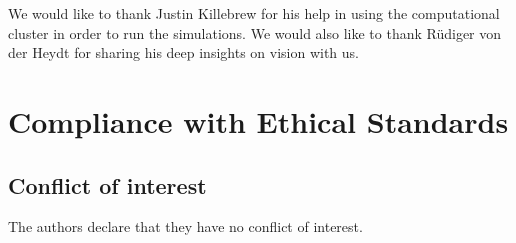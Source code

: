 \begin{acknowledgements}
We would like to thank Justin Killebrew for his help
in using the computational cluster in order to run the simulations. We would also
like to thank R\"udiger von der Heydt for sharing his deep insights on
vision with us.
\end{acknowledgements}

\section*{Compliance with Ethical Standards}
\subsection*{Conflict of interest}
The authors declare that they have no conflict of
interest.



\clearpage

\onecolumn
\appendix
\renewcommand\theequation{S\arabic{equation}}    
\setcounter{equation}{0}  
\renewcommand{\thefigure}{S\arabic{figure}} %
\setcounter{figure}{0}  %
